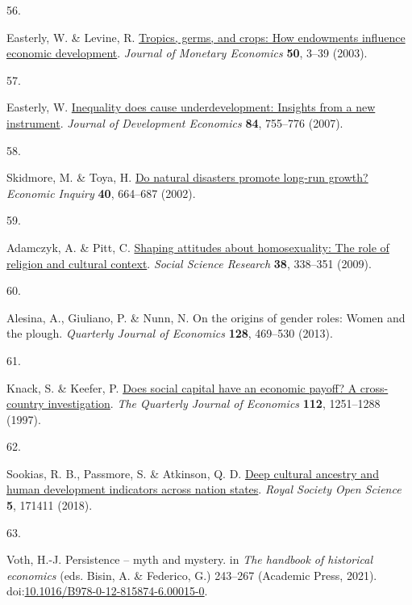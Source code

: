 \documentclass[
  man,floatsintext]{apa6}
\newlength{\cslhangindent}
\newlength{\csllabelwidth}
\newlength{\cslentryspacingunit} %
\newenvironment{CSLReferences}[2] %
 {%
  \setlength{\parindent}{0pt}
  \ifodd #1
  \let\oldpar\par
  \def\par{\hangindent=\cslhangindent\oldpar}
  \fi
  \setlength{\parskip}{#2\cslentryspacingunit}
 }%
 {}
\newcommand{\CSLLeftMargin}[1]{\parbox[t]{\csllabelwidth}{#1}}
\newcommand{\CSLRightInline}[1]{\parbox[t]{\linewidth - \csllabelwidth}{#1}\break}
\begin{document}
\begin{CSLReferences}{0}{0}
\leavevmode{}%
\CSLLeftMargin{56. }%
\CSLRightInline{Easterly, W. \& Levine, R. \href{https://doi.org/10.1016/S0304-3932(02)00200-3}{Tropics, germs, and crops: How endowments influence economic development}. \emph{Journal of Monetary Economics} \textbf{50}, 3--39 (2003).}

\leavevmode{}%
\CSLLeftMargin{57. }%
\CSLRightInline{Easterly, W. \href{https://doi.org/10.1016/j.jdeveco.2006.11.002}{Inequality does cause underdevelopment: Insights from a new instrument}. \emph{Journal of Development Economics} \textbf{84}, 755--776 (2007).}

\leavevmode{}%
\CSLLeftMargin{58. }%
\CSLRightInline{Skidmore, M. \& Toya, H. \href{https://doi.org/10.1093/ei/40.4.664}{Do natural disasters promote long-run growth?} \emph{Economic Inquiry} \textbf{40}, 664--687 (2002).}

\leavevmode{}%
\CSLLeftMargin{59. }%
\CSLRightInline{Adamczyk, A. \& Pitt, C. \href{https://doi.org/10.1016/j.ssresearch.2009.01.002}{Shaping attitudes about homosexuality: The role of religion and cultural context}. \emph{Social Science Research} \textbf{38}, 338--351 (2009).}

\leavevmode{}%
\CSLLeftMargin{60. }%
\CSLRightInline{Alesina, A., Giuliano, P. \& Nunn, N. On the origins of gender roles: Women and the plough. \emph{Quarterly Journal of Economics} \textbf{128}, 469--530 (2013).}

\leavevmode{}%
\CSLLeftMargin{61. }%
\CSLRightInline{Knack, S. \& Keefer, P. \href{https://doi.org/10.1162/003355300555475}{Does social capital have an economic payoff? A cross-country investigation}. \emph{The Quarterly Journal of Economics} \textbf{112}, 1251--1288 (1997).}

\leavevmode{}%
\CSLLeftMargin{62. }%
\CSLRightInline{Sookias, R. B., Passmore, S. \& Atkinson, Q. D. \href{https://doi.org/10.1098/rsos.171411}{Deep cultural ancestry and human development indicators across nation states}. \emph{Royal Society Open Science} \textbf{5}, 171411 (2018).}

\leavevmode{}%
\CSLLeftMargin{63. }%
\CSLRightInline{Voth, H.-J. Persistence -- myth and mystery. in \emph{The handbook of historical economics} (eds. Bisin, A. \& Federico, G.) 243--267 (Academic Press, 2021). doi:\href{https://doi.org/10.1016/B978-0-12-815874-6.00015-0}{10.1016/B978-0-12-815874-6.00015-0}.}


\end{CSLReferences}
\end{document}
